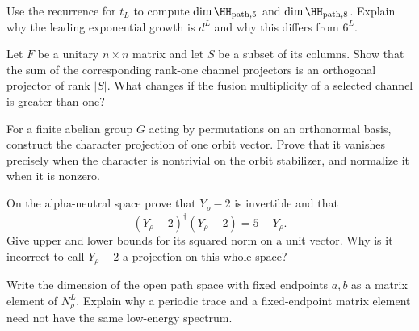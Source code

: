 \begin{exercise}\label{ex:chain-dimension}
Use the recurrence for $t_L$ to compute $\dim\HH_{\mathrm{path},5}$ and
$\dim\HH_{\mathrm{path},8}$. Explain why the leading exponential growth is $d^L$ and
why this differs from $6^L$.

\par\smallskip{}\par
\end{exercise}
\begin{exercise}\label{ex:chain-projector}
Let $F$ be a unitary $n\times n$ matrix and let $S$ be a subset of its
columns. Show that the sum of the corresponding rank-one channel
projectors is an orthogonal projector of rank $|S|$. What changes if the
fusion multiplicity of a selected channel is greater than one?

\par\smallskip{}\par
\end{exercise}
\begin{exercise}\label{ex:chain-orbit}
For a finite abelian group $G$ acting by permutations on an orthonormal
basis, construct the character projection of one orbit vector. Prove
that it vanishes precisely when the character is nontrivial on the
orbit stabilizer, and normalize it when it is nonzero.

\par\smallskip{}\par
\end{exercise}
\begin{exercise}\label{ex:chain-noninvertible}
On the alpha-neutral space prove that $Y_\rho-2$ is invertible and that
\[
 (Y_\rho-2)^\dagger(Y_\rho-2)=5-Y_\rho.
\]
Give upper and lower bounds for its squared norm on a unit vector.
Why is it incorrect to call $Y_\rho-2$ a projection on this whole space?

\par\smallskip{}\par
\end{exercise}
\begin{exercise}\label{ex:chain-boundary}
Write the dimension of the open path space with fixed endpoints $a,b$
as a matrix element of $N_\rho^L$. Explain why a periodic trace and a
fixed-endpoint matrix element need not have the same low-energy spectrum.

\par\smallskip{}\par
\end{exercise}
